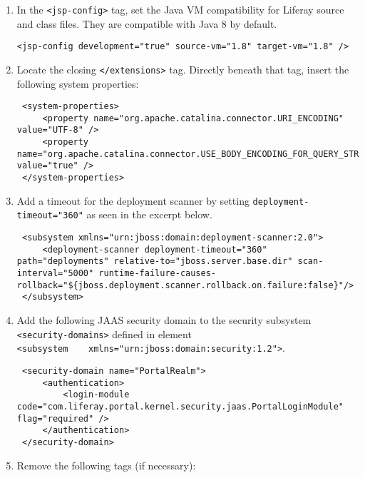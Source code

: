 \begin{enumerate}
\def\labelenumi{\arabic{enumi}.}
\item
  In the \texttt{\textless{}jsp-config\textgreater{}} tag, set the Java
  VM compatibility for Liferay source and class files. They are
  compatible with Java 8 by default.

\begin{verbatim}
<jsp-config development="true" source-vm="1.8" target-vm="1.8" />
\end{verbatim}
\item
  Locate the closing \texttt{\textless{}/extensions\textgreater{}} tag.
  Directly beneath that tag, insert the following system properties:

\begin{verbatim}
 <system-properties>
     <property name="org.apache.catalina.connector.URI_ENCODING" value="UTF-8" />
     <property name="org.apache.catalina.connector.USE_BODY_ENCODING_FOR_QUERY_STRING" value="true" />
 </system-properties>
\end{verbatim}
\item
  Add a timeout for the deployment scanner by setting
  \texttt{deployment-timeout="360"} as seen in the excerpt below.

\begin{verbatim}
 <subsystem xmlns="urn:jboss:domain:deployment-scanner:2.0">
     <deployment-scanner deployment-timeout="360" path="deployments" relative-to="jboss.server.base.dir" scan-interval="5000" runtime-failure-causes-rollback="${jboss.deployment.scanner.rollback.on.failure:false}"/>
 </subsystem>
\end{verbatim}
\item
  Add the following JAAS security domain to the security subsystem
  \texttt{\textless{}security-domains\textgreater{}} defined in element
  \texttt{\textless{}subsystem\ \ \ \ xmlns="urn:jboss:domain:security:1.2"\textgreater{}}.

\begin{verbatim}
 <security-domain name="PortalRealm">
     <authentication>
         <login-module code="com.liferay.portal.kernel.security.jaas.PortalLoginModule" flag="required" />
     </authentication>
 </security-domain>
\end{verbatim}
\item
  Remove the following tags (if necessary):


\end{enumerate}
